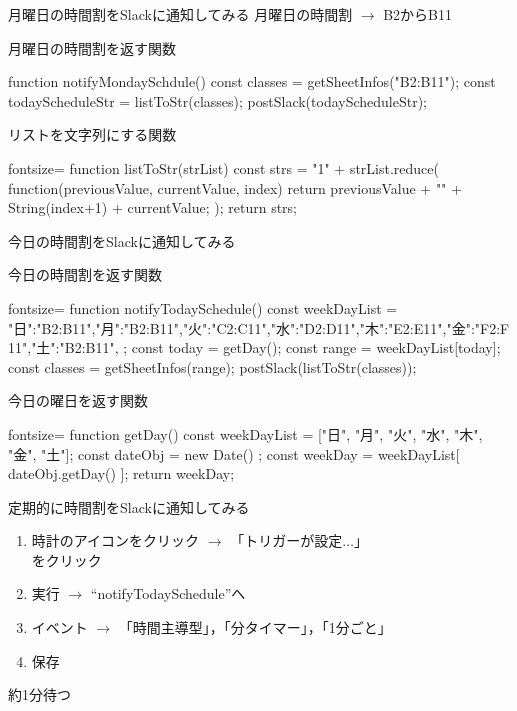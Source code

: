 \documentclass[dvipdfmx,xcolor={svgnames},aspectratio=169]{beamer}
\begin{document}
  \begin{frame}[fragile]{月曜日の時間割をSlackに通知してみる}
    月曜日の時間割 $\rightarrow$ B2からB11
    \begin{exampleblock}{月曜日の時間割を返す関数}
      \begin{GAS}
function notifyMondaySchdule(){
  const classes = getSheetInfos("B2:B11");
  const todayScheduleStr = listToStr(classes);
  postSlack(todayScheduleStr);
}
      \end{GAS}
    \end{exampleblock}
    \begin{exampleblock}{リストを文字列にする関数}
      \begin{GAS*}{fontsize=\scriptsize}
function listToStr(strList){
  const strs = "1" + strList.reduce(
    function(previousValue, currentValue, index){
      return previousValue + "\n" + String(index+1) + currentValue;
  });
  return strs;
}
      \end{GAS*}
    \end{exampleblock}
  \end{frame}
  \begin{frame}[fragile]{今日の時間割をSlackに通知してみる}
    \begin{exampleblock}{今日の時間割を返す関数}
      \begin{GAS*}{fontsize=\scriptsize}
function notifyTodaySchedule(){
  const weekDayList = {
    "日":"B2:B11","月":"B2:B11","火":"C2:C11","水":"D2:D11","木":"E2:E11","金":"F2:F11","土":"B2:B11",
  };
  const today = getDay();
  const range = weekDayList[today];
  const classes = getSheetInfos(range);
  postSlack(listToStr(classes));
}
      \end{GAS*}
    \end{exampleblock}
    \begin{exampleblock}{今日の曜日を返す関数}
      \begin{GAS*}{fontsize=\scriptsize}
function getDay(){
  const weekDayList = ["日", "月", "火", "水", "木", "金", "土"];
  const dateObj = new Date() ;
  const weekDay = weekDayList[ dateObj.getDay() ];
  return weekDay;
}
      \end{GAS*}
    \end{exampleblock}
  \end{frame}
  \begin{frame}{定期的に時間割をSlackに通知してみる}
    \begin{enumerate}\setlength{\itemsep}{15pt}
      \item 時計のアイコンをクリック $\rightarrow$ 「トリガーが設定$\ldots$」\\ をクリック
      \item 実行 $\rightarrow$ ``notifyTodaySchedule''へ
      \item イベント $\rightarrow$ 「時間主導型」，「分タイマー」，「1分ごと」
      \item 保存
    \end{enumerate}
    \LARGE 約1分待つ
  \end{frame}
\end{document}
